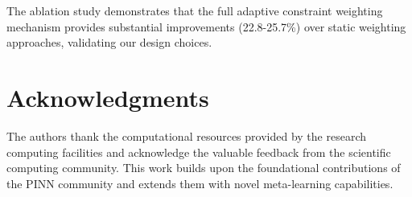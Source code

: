 \documentclass[review]{elsarticle}
\begin{document}
The ablation study demonstrates that the full adaptive constraint weighting mechanism provides substantial improvements (22.8-25.7\%) over static weighting approaches, validating our design choices.

\section*{Acknowledgments}

The authors thank the computational resources provided by the research computing facilities and acknowledge the valuable feedback from the scientific computing community. This work builds upon the foundational contributions of the PINN community and extends them with novel meta-learning capabilities.


\end{document}
